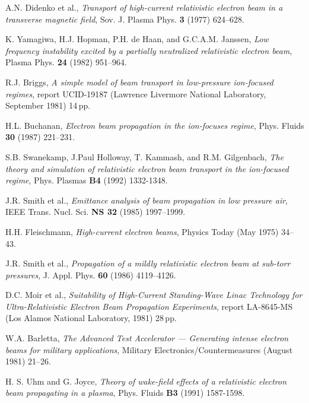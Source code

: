 \documentclass [12pt,a4paper,     ]{report} %
\begin{document}
\begin{enumerate}
 A.N. Didenko et al., \emph{Transport of high-current relativistic electron beam in a transverse magnetic field}, Sov. J. Plasma Phys. {\bf 3} (1977) 624--628.

 K. Yamagiwa, H.J. Hopman, P.H. de Haan, and G.C.A.M. Janssen, \emph{Low frequency instability excited by a partially neutralized relativistic electron beam}, Plasma Phys. {\bf 24} (1982) 951--964.

 R.J. Briggs, \emph{A simple model of beam transport in low-pressure ion-focused regimes}, report UCID-19187 (Lawrence Livermore National Laboratory, September 1981) 14\,pp.

 H.L. Buchanan, \emph{Electron beam propagation in the ion-focuses regime}, Phys. Fluids {\bf 30} (1987) 221--231.

  S.B. Swanekamp, J.Paul Holloway, T. Kammash, and R.M. Gilgenbach, \emph{The theory and simulation of relativistic electron beam transport in the ion-focused regime}, Phys. Plasmas {\bf B4} (1992) 1332-1348.

 J.R. Smith et al., \emph{Emittance analysis of beam propagation in low pressure air}, IEEE Trans. Nucl. Sci. {\bf NS 32} (1985) 1997--1999.

 H.H. Fleischmann, \emph{High-current electron beams}, Physics Today (May 1975) 34--43.

 J.R. Smith et al., \emph{Propagation of a mildly relativistic electron beam at sub-torr pressures}, J. Appl. Phys. {\bf 60} (1986) 4119--4126.  %

 D.C. Moir et al., \emph{Suitability of High-Current Standing-Wave Linac Technology for Ultra-Relativistic Electron Beam Propagation Experiments}, report LA-8645-MS (Los Alamos National Laboratory, 1981) 28\,pp.

 W.A. Barletta, \emph{The Advanced Test Accelerator --- Generating intense electron beams for military applications}, Military Electronics/Countermeasures (August 1981) 21--26.


 H. S. Uhm and G. Joyce, \emph{Theory of wake-field effects of a relativistic electron beam propagating in a plasma}, Phys. Fluids {\bf B3} (1991) 1587-1598.



\end{enumerate}
\end{document}
